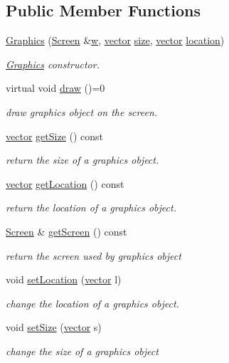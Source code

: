 \subsection*{Public Member Functions}
\begin{DoxyCompactItemize}
\item 
\hyperlink{class_graphics_a1947a936c3beadc6d2cdf156243e25ee}{Graphics} (\hyperlink{class_screen}{Screen} \&\hyperlink{class_graphics_a7a73ddd0d3cf1b67fc54f303be017c3b}{w}, \hyperlink{classvector}{vector} \hyperlink{class_graphics_a9a857a75730ffd8d473ca7624425d92a}{size}, \hyperlink{classvector}{vector} \hyperlink{class_graphics_a88c2112c7a3db3ee56f4c7fe2cac6055}{location})
\begin{DoxyCompactList}\small\item\em \hyperlink{class_graphics}{Graphics} constructor. \end{DoxyCompactList}\item 
virtual void \hyperlink{class_graphics_a144fcecfe73dd5957c081dad42e1c11d}{draw} ()=0
\begin{DoxyCompactList}\small\item\em draw graphics object on the screen. \end{DoxyCompactList}\item 
\hyperlink{classvector}{vector} \hyperlink{class_graphics_aad09e009edd57dbe96858b261e9b3605}{get\+Size} () const 
\begin{DoxyCompactList}\small\item\em return the size of a graphics object. \end{DoxyCompactList}\item 
\hyperlink{classvector}{vector} \hyperlink{class_graphics_a80b0b5536416cf79b0c9da98e419cacd}{get\+Location} () const 
\begin{DoxyCompactList}\small\item\em return the location of a graphics object. \end{DoxyCompactList}\item 
\hyperlink{class_screen}{Screen} \& \hyperlink{class_graphics_a0cfd8e41ff0a1c92ebd30089d7dd6bab}{get\+Screen} () const 
\begin{DoxyCompactList}\small\item\em return the screen used by graphics object \end{DoxyCompactList}\item 
void \hyperlink{class_graphics_a6b89d760e95a1aad37ac1996c3f9d7ea}{set\+Location} (\hyperlink{classvector}{vector} l)
\begin{DoxyCompactList}\small\item\em change the location of a graphics object. \end{DoxyCompactList}\item 
void \hyperlink{class_graphics_a473b0893180b72e3e506ff9e09618797}{set\+Size} (\hyperlink{classvector}{vector} s)
\begin{DoxyCompactList}\small\item\em change the size of a graphics object \end{DoxyCompactList}\end{DoxyCompactItemize}
